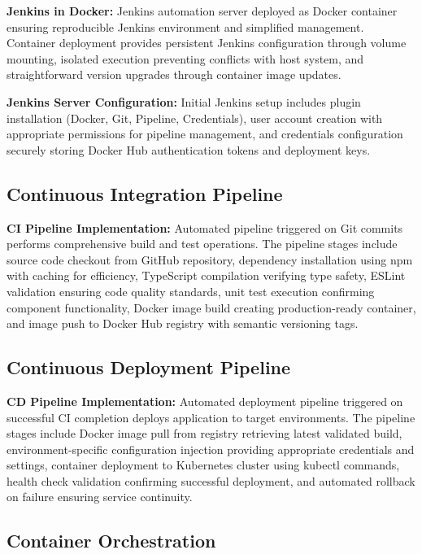 \textbf{Jenkins in Docker:} Jenkins automation server deployed as Docker container ensuring reproducible Jenkins environment and simplified management. Container deployment provides persistent Jenkins configuration through volume mounting, isolated execution preventing conflicts with host system, and straightforward version upgrades through container image updates.

\textbf{Jenkins Server Configuration:} Initial Jenkins setup includes plugin installation (Docker, Git, Pipeline, Credentials), user account creation with appropriate permissions for pipeline management, and credentials configuration securely storing Docker Hub authentication tokens and deployment keys.

\subsection{Continuous Integration Pipeline}

\textbf{CI Pipeline Implementation:} Automated pipeline triggered on Git commits performs comprehensive build and test operations. The pipeline stages include source code checkout from GitHub repository, dependency installation using npm with caching for efficiency, TypeScript compilation verifying type safety, ESLint validation ensuring code quality standards, unit test execution confirming component functionality, Docker image build creating production-ready container, and image push to Docker Hub registry with semantic versioning tags.

\subsection{Continuous Deployment Pipeline}

\textbf{CD Pipeline Implementation:} Automated deployment pipeline triggered on successful CI completion deploys application to target environments. The pipeline stages include Docker image pull from registry retrieving latest validated build, environment-specific configuration injection providing appropriate credentials and settings, container deployment to Kubernetes cluster using kubectl commands, health check validation confirming successful deployment, and automated rollback on failure ensuring service continuity.

\subsection{Container Orchestration}

